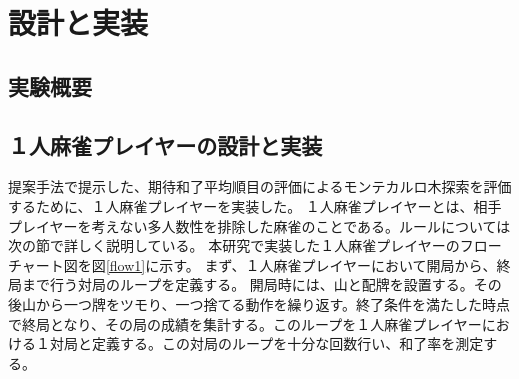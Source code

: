 \chapter{設計と実装}
\label{chap:implementation}
\section{実験概要}
\section{１人麻雀プレイヤーの設計と実装}
提案手法で提示した、期待和了平均順目の評価によるモンテカルロ木探索を評価するために、１人麻雀プレイヤーを実装した。
１人麻雀プレイヤーとは、相手プレイヤーを考えない多人数性を排除した麻雀のことである。ルールについては次の節で詳しく説明している。
本研究で実装した１人麻雀プレイヤーのフローチャート図を図\ref{flow1}に示す。
まず、１人麻雀プレイヤーにおいて開局から、終局まで行う対局のループを定義する。
開局時には、山と配牌を設置する。その後山から一つ牌をツモり、一つ捨てる動作を繰り返す。終了条件を満たした時点で終局となり、その局の成績を集計する。このループを１人麻雀プレイヤーにおける１対局と定義する。この対局のループを十分な回数行い、和了率を測定する。


